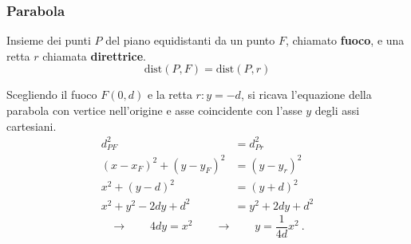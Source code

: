 \subsubsection{Parabola}
\begin{definition}[Parabola] Insieme dei punti $P$ del piano equidistanti da un punto $F$, chiamato \textbf{fuoco}, e una retta $r$ chiamata \textbf{direttrice}.
\begin{equation}
    \text{dist}(P,F) = \text{dist}(P,r) 
\end{equation}
\end{definition}
Scegliendo il fuoco $F(0, d)$ e la retta $r: y=-d$, si ricava l'equazione della parabola con vertice nell'origine e asse coincidente con l'asse $y$ degli assi cartesiani.
\begin{equation}
\begin{aligned}
    d^2_{PF} & = d^2_{Pr} \\
    (x - x_F)^2 + (y - y_F)^2 & = (y-y_r)^2 \\
    x^2 + (y - d)^2 & = (y+d)^2 \\
    x^2 + y^2 - 2dy + d^2 & = y^2 + 2dy + d^2 
\end{aligned}
\end{equation}
\begin{equation}
    \rightarrow \qquad 4d y = x^2 \qquad \rightarrow \qquad y = \dfrac{1}{4d} x^2 \ .
\end{equation}

